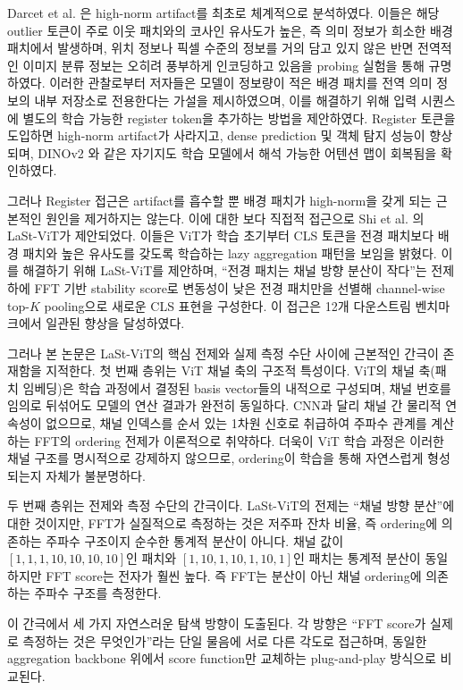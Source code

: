 \documentclass[10pt,twocolumn,letterpaper]{article}
\begin{document}
Darcet et al. \cite{darcet2024}은 high-norm artifact를 최초로 체계적으로 분석하였다. 이들은 해당 outlier 토큰이 주로 이웃 패치와의 코사인 유사도가 높은, 즉 의미 정보가 희소한 배경 패치에서 발생하며, 위치 정보나 픽셀 수준의 정보를 거의 담고 있지 않은 반면 전역적인 이미지 분류 정보는 오히려 풍부하게 인코딩하고 있음을 probing 실험을 통해 규명하였다. 이러한 관찰로부터 저자들은 모델이 정보량이 적은 배경 패치를 전역 의미 정보의 내부 저장소로 전용한다는 가설을 제시하였으며, 이를 해결하기 위해 입력 시퀀스에 별도의 학습 가능한 register token을 추가하는 방법을 제안하였다. Register 토큰을 도입하면 high-norm artifact가 사라지고, dense prediction 및 객체 탐지 성능이 향상되며, DINOv2 \cite{oquab2024}와 같은 자기지도 학습 모델에서 해석 가능한 어텐션 맵이 회복됨을 확인하였다.

그러나 Register 접근은 artifact를 흡수할 뿐 배경 패치가 high-norm을 갖게 되는 근본적인 원인을 제거하지는 않는다. 이에 대한 보다 직접적 접근으로 Shi et al. \cite{shi2026}의 LaSt-ViT가 제안되었다. 이들은 ViT가 학습 초기부터 CLS 토큰을 전경 패치보다 배경 패치와 높은 유사도를 갖도록 학습하는 lazy aggregation 패턴을 보임을 밝혔다. 이를 해결하기 위해 LaSt-ViT를 제안하며, ``전경 패치는 채널 방향 분산이 작다''는 전제 하에 FFT 기반 stability score로 변동성이 낮은 전경 패치만을 선별해 channel-wise top-$K$ pooling으로 새로운 CLS 표현을 구성한다. 이 접근은 12개 다운스트림 벤치마크에서 일관된 향상을 달성하였다.

그러나 본 논문은 LaSt-ViT의 핵심 전제와 실제 측정 수단 사이에 근본적인 간극이 존재함을 지적한다. 첫 번째 층위는 ViT 채널 축의 구조적 특성이다. ViT의 채널 축(패치 임베딩)은 학습 과정에서 결정된 basis vector들의 내적으로 구성되며, 채널 번호를 임의로 뒤섞어도 모델의 연산 결과가 완전히 동일하다. CNN과 달리 채널 간 물리적 연속성이 없으므로, 채널 인덱스를 순서 있는 1차원 신호로 취급하여 주파수 관계를 계산하는 FFT의 ordering 전제가 이론적으로 취약하다. 더욱이 ViT 학습 과정은 이러한 채널 구조를 명시적으로 강제하지 않으므로, ordering이 학습을 통해 자연스럽게 형성되는지 자체가 불분명하다.

두 번째 층위는 전제와 측정 수단의 간극이다. LaSt-ViT의 전제는 ``채널 방향 분산''에 대한 것이지만, FFT가 실질적으로 측정하는 것은 저주파 잔차 비율, 즉 ordering에 의존하는 주파수 구조이지 순수한 통계적 분산이 아니다. 채널 값이 $[1,1,1,10,10,10,10]$인 패치와 $[1,10,1,10,1,10,1]$인 패치는 통계적 분산이 동일하지만 FFT score는 전자가 훨씬 높다. 즉 FFT는 분산이 아닌 채널 ordering에 의존하는 주파수 구조를 측정한다.

이 간극에서 세 가지 자연스러운 탐색 방향이 도출된다. 각 방향은 ``FFT score가 실제로 측정하는 것은 무엇인가''라는 단일 물음에 서로 다른 각도로 접근하며, 동일한 aggregation backbone 위에서 score function만 교체하는 plug-and-play 방식으로 비교된다.
\end{document}
